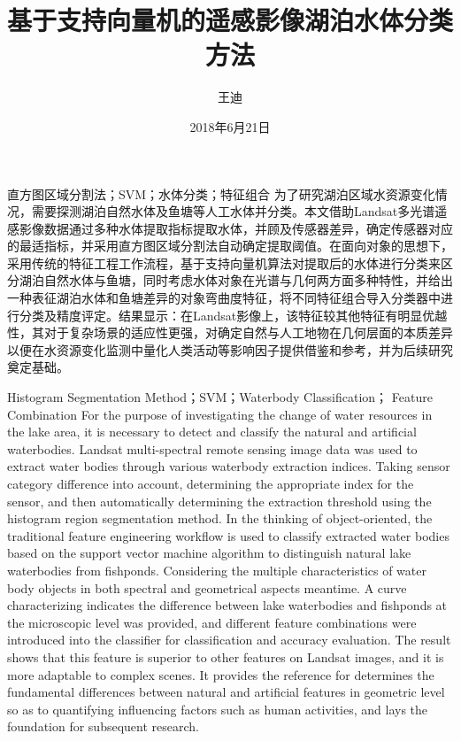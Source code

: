 \documentclass[supercite]{upcthesis}
\title{基于支持向量机的遥感影像湖泊水体分类方法}
\author{王迪}
\date{2018年6月21日}
\begin{document}
	\maketitle
	\begin{cnabstract}{直方图区域分割法；SVM；水体分类；特征组合}
		为了研究湖泊区域水资源变化情况，需要探测湖泊自然水体及鱼塘等人工水体并分类。本文借助Landsat多光谱遥感影像数据通过多种水体提取指标提取水体，并顾及传感器差异，确定传感器对应的最适指标，并采用直方图区域分割法自动确定提取阈值。在面向对象的思想下，采用传统的特征工程工作流程，基于支持向量机算法对提取后的水体进行分类来区分湖泊自然水体与鱼塘，同时考虑水体对象在光谱与几何两方面多种特性，并给出一种表征湖泊水体和鱼塘差异的对象弯曲度特征，将不同特征组合导入分类器中进行分类及精度评定。结果显示：在Landsat影像上，该特征较其他特征有明显优越性，其对于复杂场景的适应性更强，对确定自然与人工地物在几何层面的本质差异以便在水资源变化监测中量化人类活动等影响因子提供借鉴和参考，并为后续研究奠定基础。
	\end{cnabstract}
    
	\begin{enabstract}{Histogram Segmentation Method；SVM；Waterbody Classification； Feature Combination}
	For the purpose of investigating the change of water resources in the lake area, it is necessary to detect and classify the natural and artificial waterbodies. Landsat multi-spectral remote sensing image data was used to extract water bodies through various waterbody extraction indices. Taking sensor category difference into account, determining the appropriate index for the sensor, and then automatically determining the extraction threshold using the histogram region segmentation method. In the thinking of object-oriented, the traditional feature engineering workflow is used to classify extracted water bodies based on the support vector machine algorithm to distinguish natural lake waterbodies from fishponds. Considering the multiple characteristics of water body objects in both spectral and geometrical aspects meantime. A curve characterizing indicates the difference between lake waterbodies and fishponds at the microscopic level was provided, and different feature combinations were introduced into the classifier for classification and accuracy evaluation. The result shows that this feature is superior to other features on Landsat images, and it is more adaptable to complex scenes. It provides the reference for determines the fundamental differences between natural and artificial features in geometric level so as to quantifying influencing factors such as human activities, and lays the foundation for subsequent research.
	\end{enabstract}
\end{document}
